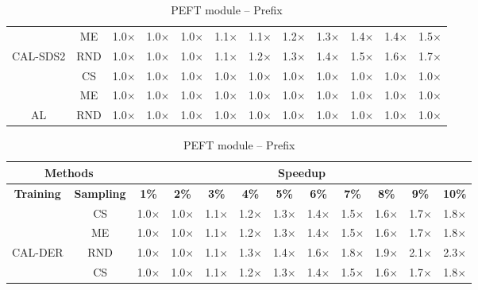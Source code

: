 \begin{table}[htbp]
\begin{subtable}{\linewidth}
\begin{tabular}{c|c|cccccccccc}
 & ME & 1.0$\times$ & 1.0$\times$ & 1.0$\times$ & 1.1$\times$ & 1.1$\times$ & 1.2$\times$ & 1.3$\times$ & 1.4$\times$ & 1.4$\times$ & 1.5$\times$\\

\multirow{-3}{*}{\raggedright\arraybackslash CAL-SDS2} & RND & 1.0$\times$ & 1.0$\times$ & 1.0$\times$ & 1.1$\times$ & 1.2$\times$ & 1.3$\times$ & 1.4$\times$ & 1.5$\times$ & 1.6$\times$ & 1.7$\times$\\
\midrule
 & CS & 1.0$\times$ & 1.0$\times$ & 1.0$\times$ & 1.0$\times$ & 1.0$\times$ & 1.0$\times$ & 1.0$\times$ & 1.0$\times$ & 1.0$\times$ & 1.0$\times$\\

 & ME & 1.0$\times$ & 1.0$\times$ & 1.0$\times$ & 1.0$\times$ & 1.0$\times$ & 1.0$\times$ & 1.0$\times$ & 1.0$\times$ & 1.0$\times$ & 1.0$\times$\\

\multirow{-3}{*}{\raggedright\arraybackslash AL} & RND & 1.0$\times$ & 1.0$\times$ & 1.0$\times$ & 1.0$\times$ & 1.0$\times$ & 1.0$\times$ & 1.0$\times$ & 1.0$\times$ & 1.0$\times$ & 1.0$\times$\\
\bottomrule
\end{tabular}
\end{subtable}
\vspace{1em}
\begin{subtable}{\linewidth}
\centering
\caption{PEFT module -- Prefix}

\begin{tabular}{c|c|cccccccccc}
\toprule
\multicolumn{2}{c|}{\textbf{Methods}} & \multicolumn{10}{c}{\textbf{Speedup}} \\
\midrule
\textbf{Training} & \textbf{Sampling} & \textbf{1\%} & \textbf{2\%} & \textbf{3\%} & \textbf{4\%} & \textbf{5\%} & \textbf{6\%} & \textbf{7\%} & \textbf{8\%} & \textbf{9\%} & \textbf{10\%}\\
\midrule
 & CS & 1.0$\times$ & 1.0$\times$ & 1.1$\times$ & 1.2$\times$ & 1.3$\times$ & 1.4$\times$ & 1.5$\times$ & 1.6$\times$ & 1.7$\times$ & 1.8$\times$\\

 & ME & 1.0$\times$ & 1.0$\times$ & 1.1$\times$ & 1.2$\times$ & 1.3$\times$ & 1.4$\times$ & 1.5$\times$ & 1.6$\times$ & 1.7$\times$ & 1.8$\times$\\

\multirow{-3}{*}{\raggedright\arraybackslash CAL-DER} & RND & 1.0$\times$ & 1.0$\times$ & 1.1$\times$ & 1.3$\times$ & 1.4$\times$ & 1.6$\times$ & 1.8$\times$ & 1.9$\times$ & 2.1$\times$ & 2.3$\times$\\
\midrule
 & CS & 1.0$\times$ & 1.0$\times$ & 1.1$\times$ & 1.2$\times$ & 1.3$\times$ & 1.4$\times$ & 1.5$\times$ & 1.6$\times$ & 1.7$\times$ & 1.8$\times$\\


\end{tabular}
\end{subtable}
\end{table}
